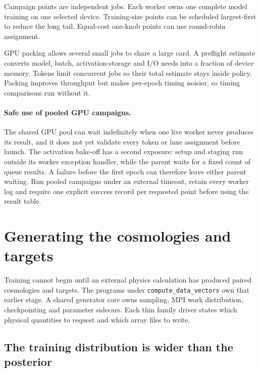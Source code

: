 \documentclass[10pt,aps,prd,twocolumn,nofootinbib]{revtex4-2}
\newcommand{\code}[1]{\texttt{#1}}
\begin{document}
Campaign points are independent jobs.  Each worker owns one complete model
training on one selected device.  Training-size
points can be scheduled largest-first to reduce the long tail.  Equal-cost
one-knob points can use round-robin assignment.

GPU packing allows several small jobs to share a large card.  A preflight
estimate converts model, batch, activation-storage and I/O needs into a
fraction of device memory.  Tokens limit concurrent jobs so their total
estimate stays inside policy.  Packing improves throughput but makes
per-epoch timing noisier, so timing comparisons run without it.

\paragraph{Safe use of pooled GPU campaigns.}
The shared GPU pool can wait indefinitely when one live worker never produces
its result, and it does not yet validate every token or lane assignment before
launch.  The activation bake-off has a second exposure: setup and staging run
outside its worker exception handler, while the parent waits for a fixed count
of queue results.  A failure before the first epoch can therefore leave either
parent waiting.  Run pooled campaigns under an external timeout, retain every
worker log and require one explicit success record per requested point before
using the result table.

\section{Generating the cosmologies and targets}
\label{sec:generation}

Training cannot begin until an external physics calculation has produced
paired cosmologies and targets.  The programs under
\code{compute\_data\_vectors} own that earlier stage.  A shared generator core
owns sampling, MPI work distribution, checkpointing and parameter sidecars.
Each thin family driver states which physical quantities to request and which
array files to write.

\subsection{The training distribution is wider than the posterior}
\end{document}

